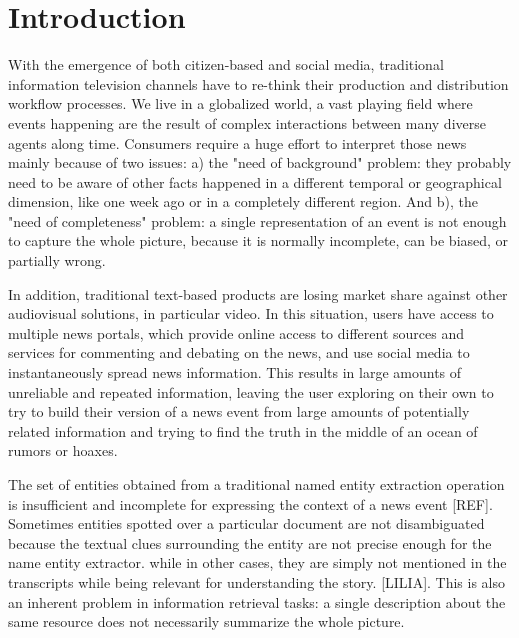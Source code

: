 \documentclass{llncs}
\begin{document}

\section{Introduction}
\label{sec:introduction}

With the emergence of both citizen-based and social media, traditional information television channels have to re-think their production and distribution workflow processes. We live in a globalized world, a vast playing field where events happening are the result of complex interactions between many diverse agents along time. Consumers require a huge effort to interpret those news mainly because of two issues: a) the "need of background" problem: they probably need to be aware of other facts happened in a different temporal or geographical dimension, like one week ago or in a completely different region. And b), the "need of completeness" problem: a single representation of an event is not enough to capture the whole picture, because it is normally incomplete, can be biased, or partially wrong. 

In addition, traditional text-based products are losing market share against other audiovisual solutions, in particular video. In this situation, users have access to multiple news portals, which provide online access to different sources and services for commenting and debating on the news, and use social media to instantaneously spread news information. This results in large amounts of unreliable and repeated information, leaving the user exploring on their own to try to build their version of a news event from large amounts of potentially related information and trying to find the truth in the middle of an ocean of rumors or hoaxes.

The set of entities obtained from a traditional named entity extraction operation is insufficient and incomplete for expressing the context of a news event  [REF]. Sometimes entities spotted over a particular document are not disambiguated because the textual clues surrounding the entity are not precise enough for the name entity extractor.  while in other cases, they are simply not mentioned in the transcripts while being relevant for understanding the story. [LILIA]. This is also an inherent problem in information retrieval tasks: a single description about the same resource does not necessarily summarize the whole picture.
\end{document}
